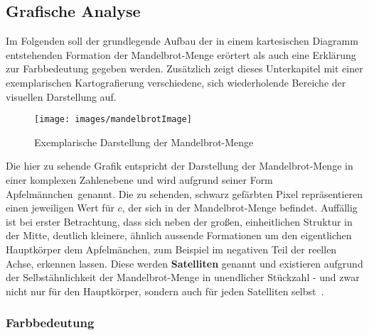 \subsection{Grafische Analyse}\label{subsec:graphical-analysis}

Im Folgenden soll der grundlegende Aufbau der in einem kartesischen Diagramm
entstehenden Formation der Mandelbrot-Menge erörtert als auch eine
Erklärung zur Farbbedeutung gegeben werden.
Zusätzlich zeigt dieses Unterkapitel mit einer exemplarischen Kartografierung
verschiedene, sich wiederholende Bereiche der visuellen Darstellung auf.

\begin{figure}[h!]
  \centering
  \texttt{[image: images/mandelbrotImage]}
  \caption[Caption for LOF]{
    Exemplarische Darstellung der Mandelbrot-Menge\footnotemark
  }
  \label{fig:mandelbrot-set}
\end{figure}

Die hier zu sehende Grafik entspricht der Darstellung der Mandelbrot-Menge
in einer komplexen Zahlenebene und wird aufgrund seiner Form
\glqq Apfelm\"annchen\grqq~genannt.
Die zu sehenden, schwarz gefärbten Pixel repräsentieren einen
jeweiligen Wert für $c$, der sich in der Mandelbrot-Menge befindet.
Auffällig ist bei erster Betrachtung, dass sich neben der großen,
einheitlichen Struktur in der Mitte,
deutlich kleinere, ähnlich aussende Formationen um den eigentlichen Hauptkörper
dem Apfelm\"anchen, zum Beispiel im negativen Teil der reellen Achse,
erkennen lassen.
Diese werden \textbf{Satelliten} genannt und existieren aufgrund der Selbstähnlichkeit
der Mandelbrot-Menge in unendlicher Stückzahl - und zwar nicht nur für den Hauptkörper,
sondern auch für jeden Satelliten selbst~\cite{lomonaco_quasi-conformal_2018}.

\subsubsection{Farbbedeutung}


